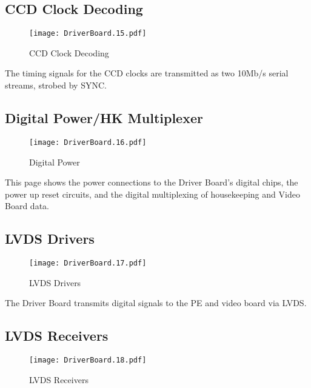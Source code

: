 \subsection{CCD Clock Decoding}
   \begin{figure}
   \begin{center}
   \texttt{[image: DriverBoard.15.pdf]}
   \end{center}
   \caption{CCD Clock Decoding}
   \end{figure}
   
The timing signals for the CCD clocks are transmitted as two 10Mb/s serial streams, strobed by SYNC.


\subsection{Digital Power/HK Multiplexer}
   \begin{figure}
   \begin{center}
   \texttt{[image: DriverBoard.16.pdf]}
   \end{center}
   \caption{Digital Power}
   \end{figure}

This page shows the power connections to the Driver Board's digital chips, the power up reset circuits, and the digital multiplexing of housekeeping and Video Board data.


\subsection{LVDS Drivers}
   \begin{figure}
   \begin{center}
   \texttt{[image: DriverBoard.17.pdf]}
   \end{center}
   \caption{LVDS Drivers}
   \end{figure}
 
The Driver Board transmits digital signals to the PE and video board via LVDS.


\subsection{LVDS Receivers}
   \begin{figure}
   \begin{center}
   \texttt{[image: DriverBoard.18.pdf]}
   \end{center}
   \caption{LVDS Receivers}
   \end{figure}

